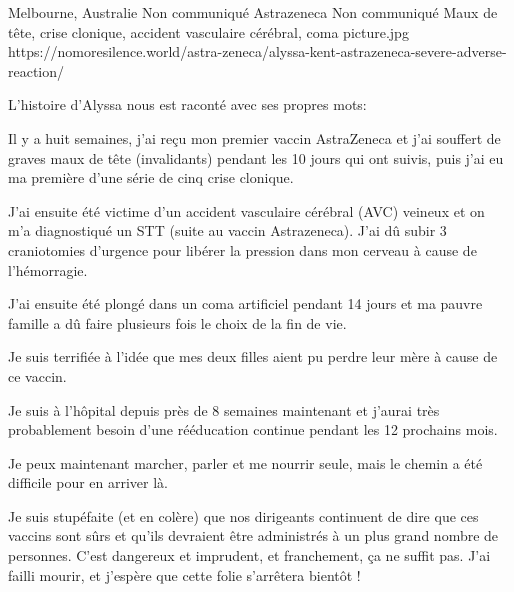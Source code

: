 {Melbourne, Australie}
{Non communiqué}
{Astrazeneca}
{Non communiqué}
{Maux de tête, crise clonique, accident vasculaire cérébral, coma}
{picture.jpg}
{https://nomoresilence.world/astra-zeneca/alyssa-kent-astrazeneca-severe-adverse-reaction/}
{

L'histoire d'Alyssa nous est raconté avec ses propres mots:

Il y a huit semaines, j'ai reçu mon premier vaccin AstraZeneca et j'ai souffert
de graves maux de tête (invalidants) pendant les 10 jours qui ont suivis, puis
j'ai eu ma première d'une série de cinq crise clonique.

J'ai ensuite été victime d'un accident vasculaire cérébral (AVC) veineux et on
m'a diagnostiqué un STT (suite au vaccin Astrazeneca). J'ai dû subir 3
craniotomies d'urgence pour libérer la pression dans mon cerveau à cause de
l'hémorragie.

J'ai ensuite été plongé dans un coma artificiel pendant 14 jours et ma pauvre
famille a dû faire plusieurs fois le choix de la fin de vie.

Je suis terrifiée à l'idée que mes deux filles aient pu perdre leur mère à cause
de ce vaccin.

Je suis à l'hôpital depuis près de 8 semaines maintenant et j'aurai très
probablement besoin d'une rééducation continue pendant les 12 prochains mois.

Je peux maintenant marcher, parler et me nourrir seule, mais le chemin a été
difficile pour en arriver là.

Je suis stupéfaite (et en colère) que nos dirigeants continuent de dire que ces
vaccins sont sûrs et qu'ils devraient être administrés à un plus grand nombre de
personnes. C'est dangereux et imprudent, et franchement, ça ne suffit pas. J'ai
failli mourir, et j'espère que cette folie s'arrêtera bientôt !

}
